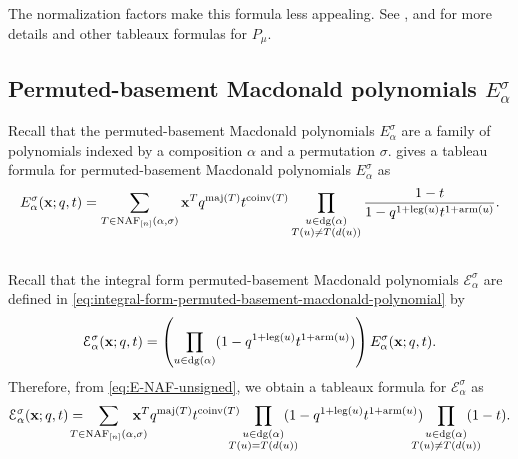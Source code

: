 The normalization factors make this formula less appealing.
See \cite[Section~4]{CHMMW22}, \cite[Section~5]{Man25book} and \cite{Man24} for more details and other tableaux formulas for \(P_\mu\).

\subsection{Permuted-basement Macdonald polynomials \texorpdfstring{\(E_\alpha^\sigma\)}{Eασ}}
\label{sec:tableau-formula}

Recall that the permuted-basement Macdonald polynomials \(E_\alpha^\sigma\) are a family of polynomials indexed by a composition \(\alpha\) and a permutation \(\sigma\).
\citeauthor{Fer11} \cite[Definition~4.4.2]{Fer11} gives a tableau formula for permuted-basement Macdonald polynomials \(E_\alpha^\sigma\) as
\begin{equation} \label{eq:E-NAF-unsigned}
	E^{\sigma}_{\alpha}(\mathbf{x}; q, t) =
	\sum_{T \in \NAF[\interval{n}](\alpha, \sigma)}
	\mathbf{x}^{T}
	q^{\maj(T)} t^{\coinv(T)}
	\prod_{\substack{u \in \dg(\alpha) \\ T(u) \neq T(\south{u})}}
	\frac{1 - t}{1 - q^{1 + \leg(u)} t^{1 + \arm(u)}}.
\end{equation}

\subsection{\texorpdfstring{}{Integral form permuted-basement Macdonald polynomials Eασ}} \label{sec:integral-form-permuted-basement}

Recall that the integral form permuted-basement Macdonald polynomials \(\mathcal{E}_\alpha^\sigma\) are defined in \eqref{eq:integral-form-permuted-basement-macdonald-polynomial} by
\begin{equation*}
	\mathcal{E}_\alpha^\sigma(\mathbf{x}; q, t)
	=
	\left(
		\prod_{u \in \dg(\alpha)} (1 - q^{1 + \leg(u)} t^{1 + \arm(u)})
	\right)
	E_\alpha^\sigma(\mathbf{x}; q, t).
\end{equation*}
Therefore, from \eqref{eq:E-NAF-unsigned}, we obtain a tableaux formula for \(\mathcal{E}_\alpha^\sigma\) as
\begin{equation} \label{eq:calE-NAF-unsigned}
	\mathcal{E}^{\sigma}_{\alpha}(\mathbf{x}; q, t) =
	\mkern 15mu
	\sum_{\mathclap{T \in \NAF[\interval{n}](\alpha, \sigma)}}
	\mkern 15mu
	\mathbf{x}^{T}
	q^{\maj(T)} t^{\coinv(T)}
	\mkern 15mu
	\prod_{\mathclap{\substack{u \in \dg(\alpha) \\ T(u) = T(\south{u})}}}
	\mkern 15mu
	(1 - q^{1 + \leg(u)} t^{1 + \arm(u)})
	\mkern 15mu
	\prod_{\mathclap{\substack{u \in \dg(\alpha) \\ T(u) \neq T(\south{u})}}}
	\mkern 15mu
	(1 - t).
\end{equation}

